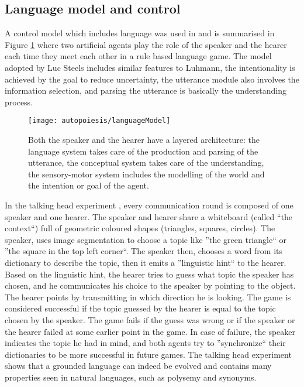 \subsection{Language model and control}
A control model which includes language was used in \citet{Steels:1999:TalkingHeads}
and is summarised in Figure \ref{Fig:Language:Talk}
where two artificial agents play the role of the speaker and the hearer each
time they meet each other in a rule based language game.
The model adopted by Luc Steels includes similar features to Luhmann, the
intentionality is achieved by the goal to reduce uncertainty, the utterance module
also involves the information selection, and parsing the utterance is basically
the understanding process.

\begin{figure}[htbp]
\begin{center}
\texttt{[image: autopoiesis/languageModel]}
\end{center}
\small{
\caption[Luc Steels language model]{
Both the speaker and the hearer have a layered architecture:
the language system takes care of the production and parsing of the utterance,
the conceptual system takes care of the understanding,
the sensory-motor system includes the modelling of the world and the intention
or goal of the agent.
\label{Fig:Language:Talk}}}
\end{figure}

In the talking head experiment \citep{Steels:1999:TalkingHeads}, every communication round
is composed of one speaker and one hearer.
The speaker and hearer share a whiteboard (called ``the context``)
full of geometric coloured shapes (triangles, squares, circles).
The speaker, uses image segmentation to choose a topic like ''the green triangle``
or ''the square in the top left corner``.
The speaker then, chooses a word from its dictionary to describe the topic,
then it emits a ''linguistic hint`` to the hearer.
Based on the linguistic hint, the hearer tries to guess what topic the speaker
has chosen, and he communicates his choice to the speaker by pointing to the object.
The hearer points by transmitting in which direction he is looking.
The game is considered successful if the topic guessed by the hearer is equal
to the topic chosen by the speaker.
The game fails if the guess was wrong or if the speaker or the hearer failed at
some earlier point in the game.
In case of failure, the speaker indicates the topic he had in mind, and both
agents try to ''synchronize`` their dictionaries to be more successful in future games.
The talking head experiment shows that a grounded language can indeed be
evolved and contains many properties seen in natural languages, such as polysemy and synonyms.

